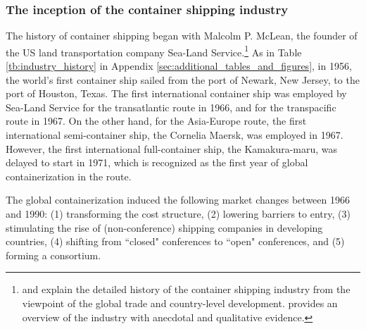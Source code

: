 \documentclass[11pt]{article}
\begin{document}


\subsubsection{The inception of the container shipping industry}\label{subsec:inception_of_container_shipping_industry}

The history of container shipping began with Malcolm P. McLean, the founder of the US land transportation company Sea-Land Service.\footnote{\cite{bernhofen2016estimating} and \cite{rua2014diffusion} explain the detailed history of the container shipping industry from the viewpoint of the global trade and country-level development. \cite{levinson2016box} provides an overview of the industry with anecdotal and qualitative evidence.}  As in Table \ref{tb:industry_history} in Appendix \ref{sec:additional_tables_and_figures}, in 1956, the world's first container ship sailed from the port of Newark, New Jersey, to the port of Houston, Texas. The first international container ship was employed by Sea-Land Service for the transatlantic route in 1966, and for the transpacific route in 1967. On the other hand, for the Asia-Europe route, the first international semi-container ship, the Cornelia Maersk, was employed in 1967. However, the first international full-container ship, the Kamakura-maru, was delayed to start in 1971, which is recognized as the first year of global containerization in the route.

The global containerization induced the following market changes between 1966 and 1990: (1) transforming the cost structure, (2) lowering barriers to entry, (3) stimulating the rise of (non-conference) shipping companies in developing countries, (4) shifting from ``closed" conferences to ``open" conferences, and (5) forming a consortium.
\end{document}
